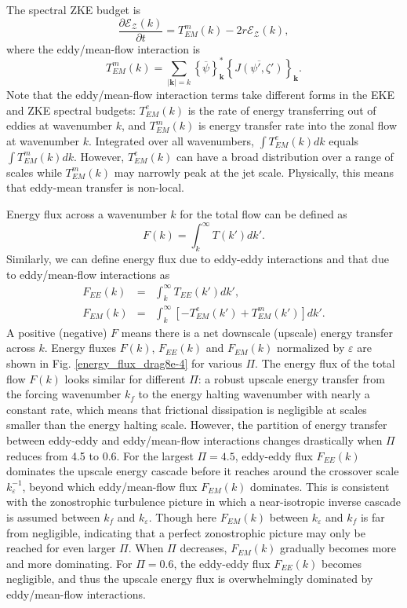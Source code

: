\documentclass{ametsoc}
\begin{document}
The spectral ZKE budget is
\begin{equation}
\frac{\partial\mathcal{E}_{\mathcal{Z}}(k)}{\partial t}=T_{EM}^{m}(k)-2r\mathcal{E}_{\mathcal{Z}}(k),\label{eq:spectral_ZKE_budget}
\end{equation}
where the eddy/mean-flow interaction is
\begin{equation}
T_{EM}^{m}(k)=\underset{|\mathbf{k}|=k}{\sum}\left\{ \overline{\psi}\right\} _{\mathbf{k}}^{*}\left\{ \overline{J(\psi',\zeta')}\right\} _{\mathbf{k}}.
\end{equation}
Note that the eddy/mean-flow interaction terms take different forms in the EKE
and ZKE spectral budgets: $T_{EM}^{e}(k)$ is the rate of energy
transferring out of eddies at wavenumber $k$, and $T_{EM}^{m}(k)$ is
energy transfer rate into the zonal flow at wavenumber $k$. Integrated
over all wavenumbers, $\int T_{EM}^{e}(k)dk$ equals $\int T_{EM}^{m}(k)dk$.
However, $T_{EM}^{e}(k)$ can have a broad distribution over a range
of scales while $T_{EM}^{m}(k)$ may narrowly peak at the jet scale.
Physically, this means that eddy-mean transfer is non-local.

Energy flux across a wavenumber $k$ for the total flow can be defined
as
\begin{equation}
F(k)=\int_{k}^{\infty}T(k')dk'.\label{eq:energy_flux}
\end{equation}
Similarly, we can define energy flux due to eddy-eddy interactions
and that due to eddy/mean-flow interactions as
\begin{eqnarray}
F_{EE}(k) & = & \int_{k}^{\infty}T_{EE}(k')dk',\label{eq:energy_flux_EE}\\
F_{EM}(k) & = & \int_{k}^{\infty}\left[-T_{EM}^{e}(k')+T_{EM}^{m}(k')\right]dk'.
\end{eqnarray}
A positive (negative) $F$ means there is a net downscale (upscale)
energy transfer across $k$. Energy fluxes $F(k)$, $F_{EE}(k)$ and
$F_{EM}(k)$ normalized by $\varepsilon$ are shown in Fig. \ref{energy_flux_drag8e-4}
for various $\Pi$. The energy flux of the total flow $F(k)$ looks
similar for different $\Pi$: a robust upscale energy transfer from
the forcing wavenumber $k_{f}$ to the energy halting wavenumber with
nearly a constant rate, which means that frictional dissipation is
negligible at scales smaller than the energy halting scale. However,
the partition of energy transfer between eddy-eddy and eddy/mean-flow
interactions changes drastically when $\Pi$ reduces from 4.5 to 0.6.
For the largest $\Pi=4.5$, eddy-eddy flux $F_{EE}(k)$ dominates
the upscale energy cascade before it reaches around
the crossover scale $k_{\varepsilon}^{-1}$, beyond which eddy/mean-flow
flux $F_{EM}(k)$ dominates. This is consistent with the zonostrophic turbulence
picture in which a near-isotropic inverse cascade is assumed between
$k_{f}$ and $k_{\varepsilon}$. Though here $F_{EM}(k)$ between
$k_{\varepsilon}$ and $k_{f}$ is far from negligible, indicating
that a perfect zonostrophic picture may only be reached for even larger
$\Pi$. When $\Pi$ decreases, $F_{EM}(k)$ gradually becomes more 
and more dominating. For $\Pi=0.6$, the eddy-eddy
flux $F_{EE}(k)$ becomes negligible, and thus the upscale energy
flux is overwhelmingly dominated by eddy/mean-flow interactions.
\end{document}
